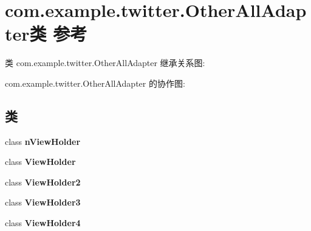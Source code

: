 \hypertarget{classcom_1_1example_1_1twitter_1_1_other_all_adapter}{}\section{com.\+example.\+twitter.\+Other\+All\+Adapter类 参考}
\label{classcom_1_1example_1_1twitter_1_1_other_all_adapter}


类 com.\+example.\+twitter.\+Other\+All\+Adapter 继承关系图\+:


com.\+example.\+twitter.\+Other\+All\+Adapter 的协作图\+:
\subsection*{类}
\begin{DoxyCompactItemize}
\item 
class {\bfseries n\+View\+Holder}
\item 
class {\bfseries View\+Holder}
\item 
class {\bfseries View\+Holder2}
\item 
class {\bfseries View\+Holder3}
\item 
class {\bfseries View\+Holder4}
\end{DoxyCompactItemize}
